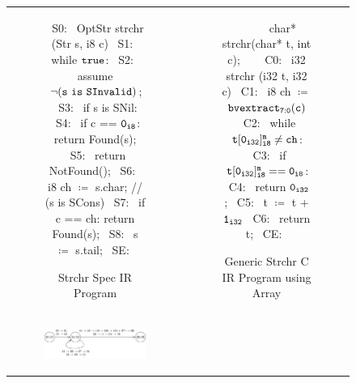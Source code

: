 \begin{figure}
\begin{tabular}{cc}
\begin{subfigure}[b]{0.55\textwidth}
\begin{center}
\begin{allLangEnvFoot}
~{\tiny \textcolor{mygray}{S0:}}~ OptStr strchr (Str s, i8 c) {
~{\tiny \textcolor{mygray}{S1:}}~   while ${\tt true}$:
~{\tiny \textcolor{mygray}{S2:}}~     assume ${\tt \neg (s\ is\ SInvalid)}$;
~{\tiny \textcolor{mygray}{S3:}}~     if s is SNil:
~{\tiny \textcolor{mygray}{S4:}}~       if c == ${\tt 0_{i8}}$: return Found(s);
~{\tiny \textcolor{mygray}{S5:}}~       return NotFound();
~{\tiny \textcolor{mygray}{S6:}}~     i8 ch $\coloneq$ s.char; // (s is SCons)
~{\tiny \textcolor{mygray}{S7:}}~     if c == ch: return Found(s);
~{\tiny \textcolor{mygray}{S8:}}~     s $\coloneq$ s.tail;
~{\tiny \textcolor{mygray}{SE:}}~ }
\end{allLangEnvFoot}
\end{center}
\caption{\label{fig:llStrchrSpecIR}Strchr Spec IR Program}
\end{subfigure}%
&
\begin{subfigure}[b]{0.46\textwidth}
\begin{center}
\begin{allLangEnvFoot}
~{\tiny \textcolor{mygray}{\ \ \ }}~ char* strchr(char* t, int c);
~{\tiny \textcolor{mygray}{}}~
~{\tiny \textcolor{mygray}{C0:}}~ i32 strchr (i32 t, i32 c) {
~{\tiny \textcolor{mygray}{C1:}}~   i8 ch $\coloneq$ ${\tt bvextract_{7:0}(c)}$
~{\tiny \textcolor{mygray}{C2:}}~   while $\mathrm{\tt t[0_{i32}]^m_{i8} \neq ch}$:
~{\tiny \textcolor{mygray}{C3:}}~     if $\mathrm{\tt t[0_{i32}]^m_{i8} == 0_{i8}}$:
~{\tiny \textcolor{mygray}{C4:}}~       return ${\tt 0_{i32}}$;
~{\tiny \textcolor{mygray}{C5:}}~     t $\coloneq$ t + ${\tt 1_{i32}}$
~{\tiny \textcolor{mygray}{C6:}}~   return t;
~{\tiny \textcolor{mygray}{CE:}}~ }
\end{allLangEnvFoot}
\end{center}
\caption{\label{fig:llStrchrCArrIR}Generic Strchr C IR Program using Array}
\end{subfigure}%
\\
\begin{subfigure}[b]{0.55\textwidth}
\begin{center}
\includegraphics[scale=0.87]{chapters/figures/figStrchrProductCfg.pdf}

\end{center}
\end{subfigure}
\end{tabular}
\end{figure}
